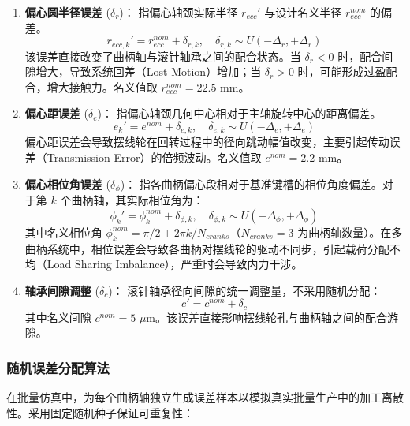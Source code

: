 \documentclass[12pt]{ctexart}
\begin{document}
\begin{enumerate}
    \item \textbf{偏心圆半径误差} ($\delta_r$)：
    指偏心轴颈实际半径 $r_{ecc}'$ 与设计名义半径 $r_{ecc}^{nom}$ 的偏差。
    \begin{equation}
    r_{ecc,k}' = r_{ecc}^{nom} + \delta_{r,k}, \quad \delta_{r,k} \sim U(-\Delta_r, +\Delta_r)
    \end{equation}
    该误差直接改变了曲柄轴与滚针轴承之间的配合状态。当 $\delta_r < 0$ 时，配合间隙增大，导致系统回差（Lost Motion）增加；当 $\delta_r > 0$ 时，可能形成过盈配合，增大接触力。名义值取 $r_{ecc}^{nom} = 22.5$ mm。

    \item \textbf{偏心距误差} ($\delta_e$)：
    指偏心轴颈几何中心相对于主轴旋转中心的距离偏差。
    \begin{equation}
    e_k' = e^{nom} + \delta_{e,k}, \quad \delta_{e,k} \sim U(-\Delta_e, +\Delta_e)
    \end{equation}
    偏心距误差会导致摆线轮在回转过程中的径向跳动幅值改变，主要引起传动误差（Transmission Error）的倍频波动。名义值取 $e^{nom} = 2.2$ mm。

    \item \textbf{偏心相位角误差} ($\delta_\phi$)：
    指各曲柄偏心段相对于基准键槽的相位角度偏差。对于第 $k$ 个曲柄轴，其实际相位角为：
    \begin{equation}
    \phi_k' = \phi_k^{nom} + \delta_{\phi,k}, \quad \delta_{\phi,k} \sim U(-\Delta_\phi, +\Delta_\phi)
    \end{equation}
    其中名义相位角 $\phi_k^{nom} = \pi/2 + 2\pi k / N_{cranks}$（$N_{cranks} = 3$ 为曲柄轴数量）。在多曲柄系统中，相位误差会导致各曲柄对摆线轮的驱动不同步，引起载荷分配不均（Load Sharing Imbalance），严重时会导致内力干涉。

    \item \textbf{轴承间隙调整} ($\delta_c$)：
    滚针轴承径向间隙的统一调整量，不采用随机分配：
    \begin{equation}
    c' = c^{nom} + \delta_c
    \end{equation}
    其中名义间隙 $c^{nom} = 5$ $\mu$m。该误差直接影响摆线轮孔与曲柄轴之间的配合游隙。
\end{enumerate}

\subsubsection{随机误差分配算法}
在批量仿真中，为每个曲柄轴独立生成误差样本以模拟真实批量生产中的加工离散性。采用固定随机种子保证可重复性：
\end{document}
